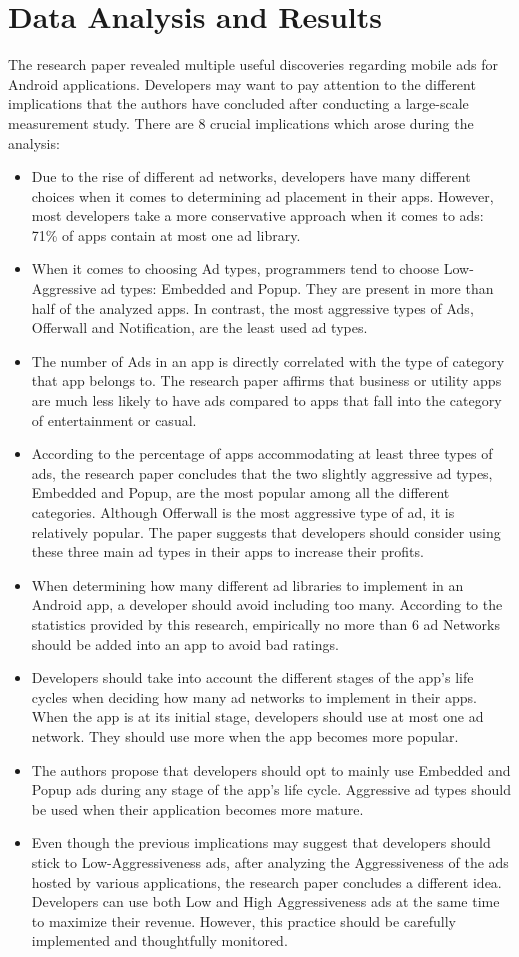 \documentclass[conference]{IEEEtran}
\begin{document}
\section{Data Analysis and Results}
The research paper revealed multiple useful discoveries regarding mobile ads for Android applications. Developers may want to pay attention to the different implications that the authors have concluded after conducting a large-scale measurement study. There are 8 crucial implications which arose during the analysis:
\begin{itemize}
\item Due to the rise of different ad networks, developers have many different choices when it comes to determining ad placement in their apps. However, most developers take a more conservative approach when it comes to ads: 71\% of apps contain at most one ad library.
\item When it comes to choosing Ad types, programmers tend to choose Low-Aggressive ad types: Embedded and Popup. They are present in more than half of the analyzed apps. In contrast, the most aggressive types of Ads, Offerwall and Notification, are the least used ad types.
\item The number of Ads in an app is directly correlated with the type of category that app belongs to. The research paper affirms that business or utility apps are much less likely to have ads compared to apps that fall into the category of entertainment or casual.
\item According to the percentage of apps accommodating at least three types of ads, the research paper concludes that the two slightly aggressive ad types, Embedded and Popup, are the most popular among all the different categories. Although Offerwall is the most aggressive type of ad, it is relatively popular. The paper suggests that developers should consider using these three main ad types in their apps to increase their profits.
\item When determining how many different ad libraries to implement in an Android app, a developer should avoid including too many. According to the statistics provided by this research, empirically no more than 6 ad Networks should be added into an app to avoid bad ratings.
\item Developers should take into account the different stages of the app's life cycles when deciding how many ad networks to implement in their apps. When the app is at its initial stage, developers should use at most one ad network. They should use more when the app becomes more popular.
\item The authors propose that developers should opt to mainly use Embedded and Popup ads during any stage of the app's life cycle. Aggressive ad types should be used when their application becomes more mature.
\item Even though the previous implications may suggest that developers should stick to Low-Aggressiveness ads, after analyzing the Aggressiveness of the ads hosted by various applications, the research paper concludes a different idea. Developers can use both Low and High Aggressiveness ads at the same time to maximize their revenue. However, this practice should be carefully implemented and thoughtfully monitored.
\end{itemize}
\end{document}
